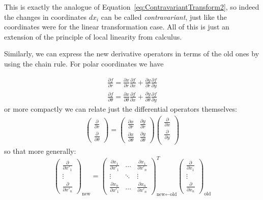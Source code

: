 	This is exactly the analogue of Equation~\eqref{eq:ContravariantTransform2}, so indeed the changes in coordinates $dx_i$ can be called \emph{contravariant}, just like the coordinates were for the linear transformation case. All of this is just an extension of the principle of local linearity from calculus.
	
	Similarly, we can express the new derivative operators in terms of the old ones by using the chain rule. For polar coordinates we have
	
	\begin{align*}
		\frac{\partial f}{\partial r} = \frac{\partial x}{\partial r}\frac{\partial f}{\partial x}  +  \frac{\partial y}{\partial r} \frac{\partial f}{\partial y} \\
		\frac{\partial f}{\partial \theta} = \frac{\partial x}{\partial \theta}\frac{\partial f}{\partial x}  + \frac{\partial y}{\partial \theta}\frac{\partial f}{\partial y}
	\end{align*}
	or more compactly we can relate just the differential operators themselves: 
	\begin{align*}
		\begin{pmatrix}
			\frac{\partial}{\partial r} \\ \frac{\partial}{\partial \theta}
		\end{pmatrix}
		 = 
		 \begin{pmatrix}
		 	\frac{\partial x}{\partial r} & \frac{\partial y}{\partial r} \\
			\frac{\partial x}{\partial \theta} & \frac{\partial y}{\partial \theta}
		 \end{pmatrix}
		 \begin{pmatrix}
		 	\frac{\partial}{\partial x} \\ \frac{\partial}{\partial y} \\
		 \end{pmatrix}
	\end{align*}
	so that more generally: 
	\begin{equation}\label{eq:partial_transform}
		\begin{pmatrix}
			\frac{\partial}{\partial x'_1} \\ \vdots \\ \frac{\partial}{\partial x'_n} 
		\end{pmatrix}_{\text{new}}
		=
	 \begin{pmatrix}
	 	\frac{\partial x_1}{\partial x'_1} & \dots & \frac{\partial x_1}{\partial x'_n} \\
		\vdots & \ddots & \vdots \\
		\frac{\partial x_n}{\partial x'_1} & \dots & \frac{\partial x_n}{\partial x'_n}
	 \end{pmatrix}_{\text{new} \leftarrow \text{old}}^T
	 \begin{pmatrix}
	 	\frac{\partial}{\partial x_1} \\	\vdots \\ \frac{\partial}{\partial x_n}
	 \end{pmatrix}_{\text{old}}
	\end{equation}
